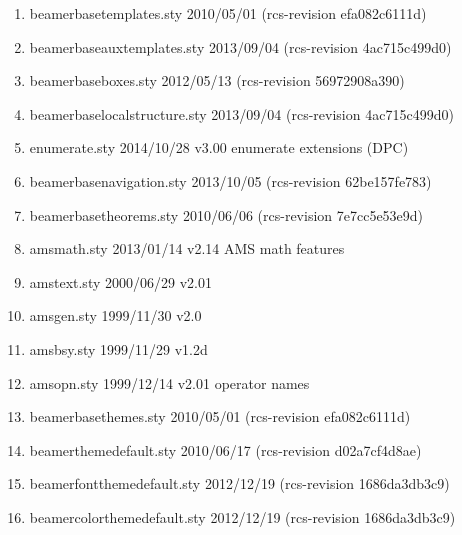 \begin{enumerate}
\item 		 beamerbasetemplates.sty 2010/05/01 (rcs-revision efa082c6111d)
\item 		 beamerbaseauxtemplates.sty 2013/09/04 (rcs-revision 4ac715c499d0)
\item 		 beamerbaseboxes.sty 2012/05/13 (rcs-revision 56972908a390)
\item 		 beamerbaselocalstructure.sty 2013/09/04 (rcs-revision 4ac715c499d0)
\item 		 enumerate.sty 2014/10/28 v3.00 enumerate extensions (DPC)
\item 		 beamerbasenavigation.sty 2013/10/05 (rcs-revision 62be157fe783)
\item 		 beamerbasetheorems.sty 2010/06/06 (rcs-revision 7e7cc5e53e9d)
\item 		 amsmath.sty 2013/01/14 v2.14 AMS math features
\item amstext.sty 2000/06/29 v2.01
\item amsgen.sty 1999/11/30 v2.0
\item amsbsy.sty 1999/11/29 v1.2d
\item amsopn.sty 1999/12/14 v2.01 operator names
\item 		 beamerbasethemes.sty 2010/05/01 (rcs-revision efa082c6111d)
\item 		 beamerthemedefault.sty 2010/06/17 (rcs-revision d02a7cf4d8ae)
\item 		 beamerfontthemedefault.sty 2012/12/19 (rcs-revision 1686da3db3c9)
\item 		 beamercolorthemedefault.sty	 2012/12/19 (rcs-revision 1686da3db3c9)

\end{enumerate}
